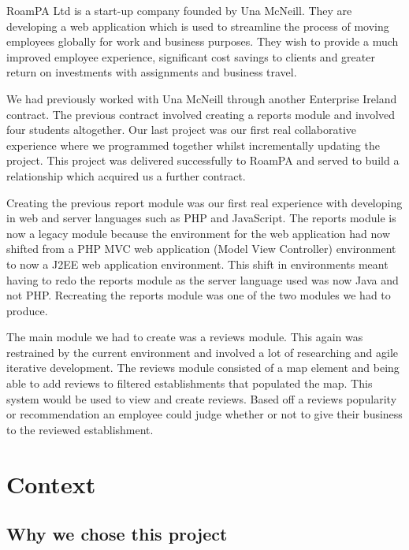 RoamPA Ltd is a start-up company founded by Una McNeill. They are developing a web application which is used to streamline the process of moving employees globally for work and business purposes. They wish to provide a much improved employee experience, significant cost savings to clients and greater return on investments with assignments and business travel.

We had previously worked with Una McNeill through another Enterprise Ireland contract. The previous contract involved creating a reports module and involved four students altogether. Our last project was our first real collaborative experience where we programmed together whilst incrementally updating the project. This project was delivered successfully to RoamPA and served to build a relationship which acquired us a further contract. 

Creating the previous report module was our first real experience with developing in web and server languages such as PHP and JavaScript. The reports module is now a legacy module because the environment for the web application had now shifted from a PHP MVC web application (Model View Controller) environment to now a J2EE web application environment. This shift in environments meant having to redo the reports module as the server language used was now Java and not PHP. Recreating the reports module was one of the two modules we had to produce.

The main module we had to create was a reviews module. This again was restrained by the current environment and involved a lot of researching and agile iterative development. The reviews module consisted of a map element and being able to add reviews to filtered establishments that populated the map. This system would be used to view and create reviews. Based off a reviews popularity or recommendation an employee could judge whether or not to give their business to the reviewed establishment.

\newpage

\chapter{Context}

\section{Why we chose this project}


